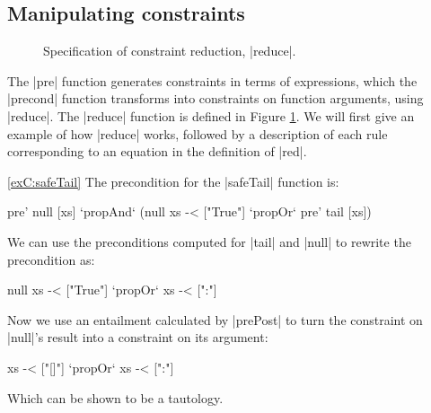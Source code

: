 \subsection{Manipulating constraints}
\label{secC:backward}

\begin{figure}
\caption{Specification of constraint reduction, |reduce|.}
\label{figC:backward}
\end{figure}

The |pre| function generates constraints in terms of expressions, which the |precond| function transforms into constraints on function arguments, using |reduce|. The |reduce| function is defined in Figure \ref{figC:backward}. We will first give an example of how |reduce| works, followed by a description of each rule corresponding to an equation in the definition of |red|.

\begin{examplerevisit}{\ref{exC:safeTail}}
The precondition for the |safeTail| function is:

\ignore\begin{code}
pre' null [xs] `propAnd` (null xs -< ["True"] `propOr` pre' tail [xs])
\end{code}

\noindent We can use the preconditions computed for |tail| and |null| to rewrite the precondition as:

\ignore\begin{code}
null xs -< ["True"] `propOr` xs -< [":"]
\end{code}

\noindent Now we use an entailment calculated by |prePost| to turn the constraint on |null|'s result into a constraint on its argument:

\ignore\begin{code}
xs -< ["[]"] `propOr` xs -< [":"]
\end{code}

\noindent Which can be shown to be a tautology.
\end{examplerevisit}


